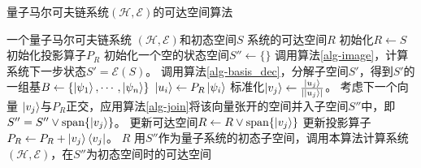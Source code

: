 
\begin{algorithm}
\caption{量子马尔可夫链系统$(\mathcal{H},\mathcal{E})$的可达空间算法}
\label{alg-reachable}
\begin{algorithmic}[1] %
    \Require 一个量子马尔可夫链系统 $(\mathcal{H},\mathcal{E})$和初态空间$S$
    \Ensure 系统的可达空间$R$
    \State 初始化$R \gets S$
    \State 初始化投影算子$P_{R}$
    \State 初始化一个空的状态空间$S'' \gets \{\}$
    \State 调用算法\ref{alg-image}，计算系统下一步状态$S'=\mathcal{E}(S)$。
    \State 调用算法\ref{alg-basis_dec}，分解子空间$S'$，得到$S'$的一组基$B\gets \{\ket{\psi_{1}}, \cdots, \ket{\psi_{n}}\}$
        \State $\ket{u_i} \gets P_R \ket{\psi_{i}}$
        \State 标准化$\ket{v_j} \gets \frac{\ket{u_j}}{|\ket{u_j}|}$。
            \State 考虑下一个向量
        \Else
            \State $\ket{v_j}$与$P_R$正交，应用算法\ref{alg-join}将该向量张开的空间并入子空间$S''$中，即$S'' = S'' \vee \text{span}\{\ket{v_j}\}$。
            \State 更新可达空间$R \gets R \vee \text{span}\{\ket{v_j}\}$
            \State 更新投影算子 $P_R \gets P_R + \ket{v_j}\bra{v_j}$。
        \EndIf
    \EndFor
    \State \Return $R$
    \Else
        \State 用$S''$作为量子系统的初态子空间，调用本算法计算系统$(\mathcal{H},\mathcal{E})$，在\(S''\)为初态空间时的可达空间
    \EndIf
\end{algorithmic}
\end{algorithm}

